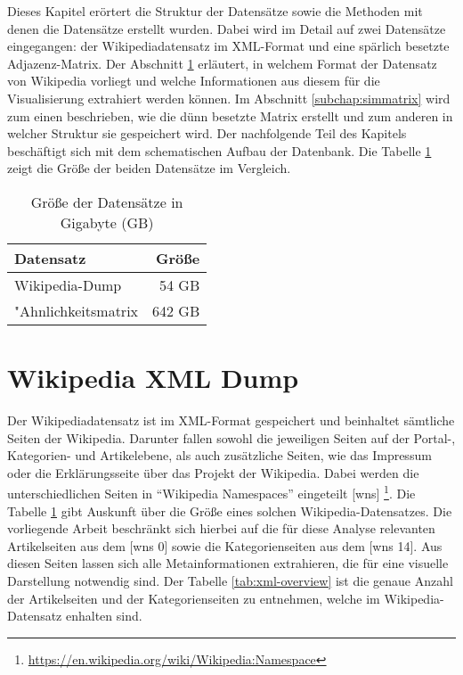
Dieses Kapitel erörtert die Struktur der Datensätze sowie die Methoden mit denen die Datensätze erstellt wurden.
Dabei wird im Detail auf zwei Datensätze eingegangen: der Wikipediadatensatz im XML-Format und eine spärlich besetzte Adjazenz-Matrix.
Der Abschnitt \ref{subchap:wikidump} erläutert, in welchem Format der Datensatz von Wikipedia vorliegt und welche Informationen aus diesem für die Visualisierung extrahiert werden können.
Im Abschnitt \ref{subchap:simmatrix} wird zum einen beschrieben, wie die dünn besetzte Matrix erstellt und zum anderen in welcher Struktur sie gespeichert wird.
Der nachfolgende Teil des Kapitels beschäftigt sich mit dem schematischen Aufbau der Datenbank.
Die Tabelle \ref{tab:dataset-size} zeigt die Größe der beiden Datensätze im Vergleich.


\begin{table}
\centering
\begin{tabular}{l r}
  \hline
  Datensatz & Größe \\
  \hline
  Wikipedia-Dump & 54 GB \\
  "Ahnlichkeitsmatrix & 642 GB \\
  \hline
\end{tabular}
\caption{Größe der Datensätze in Gigabyte (GB)}
\label{tab:dataset-size}
\end{table}



\section{Wikipedia XML Dump}
\label{subchap:wikidump}

 
Der Wikipediadatensatz ist im XML-Format gespeichert und beinhaltet sämtliche Seiten der Wikipedia. 
Darunter fallen sowohl die jeweiligen Seiten auf der Portal-, Kategorien- und Artikelebene, als auch zusätzliche Seiten, wie das Impressum oder die Erklärungsseite über das Projekt der Wikipedia.
Dabei werden die unterschiedlichen Seiten in "`Wikipedia Namespaces"' eingeteilt [wns] \footnote{\url{https://en.wikipedia.org/wiki/Wikipedia:Namespace}}.
Die Tabelle \ref{tab:dataset-size} gibt Auskunft über die Größe eines solchen Wikipedia-Datensatzes.
Die vorliegende Arbeit beschränkt sich hierbei auf die für diese Analyse relevanten Artikelseiten aus dem [wns 0] sowie die Kategorienseiten aus dem [wns 14].
Aus diesen Seiten lassen sich alle Metainformationen extrahieren, die für eine visuelle Darstellung notwendig sind.
Der Tabelle \ref{tab:xml-overview} ist die genaue Anzahl der Artikelseiten und der Kategorienseiten zu entnehmen, welche im Wikipedia-Datensatz enhalten sind.

